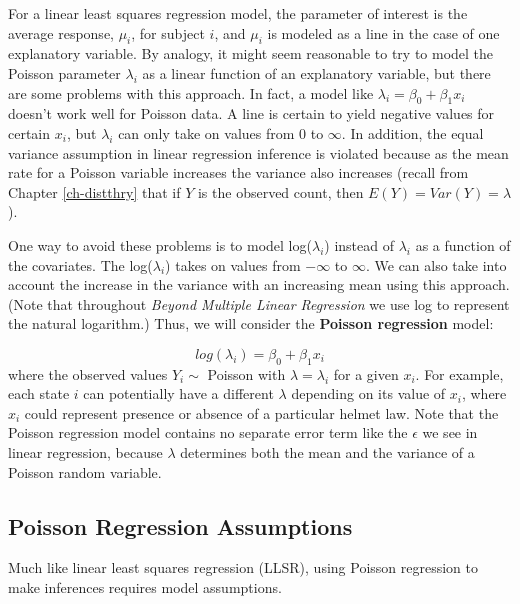 \documentclass[
]{krantz}
\begin{document}
For a linear least squares regression model, the parameter of interest is the average response, \(\mu_i\), for subject \(i\), and \(\mu_i\) is modeled as a line in the case of one explanatory variable. By analogy, it might seem reasonable to try to model the Poisson parameter \(\lambda_i\) as a linear function of an explanatory variable, but there are some problems with this approach. In fact, a model like \(\lambda_i=\beta_0+\beta_1x_i\) doesn't work well for Poisson data. A line is certain to yield negative values for certain \(x_i\), but \(\lambda_i\) can only take on values from 0 to \(\infty\). In addition, the equal variance assumption in linear regression inference is violated because as the mean rate for a Poisson variable increases the variance also increases (recall from Chapter \ref{ch-distthry} that if \(Y\) is the observed count, then \(E(Y)=Var(Y)=\lambda\)).

One way to avoid these problems is to model log(\(\lambda_i\)) instead of \(\lambda_i\) as a function of the covariates. The log(\(\lambda_i\)) takes on values from \(-\infty\) to \(\infty\). We can also take into account the increase in the variance with an increasing mean using this approach. (Note that throughout \emph{Beyond Multiple Linear Regression} we use log to represent the natural logarithm.) Thus, we will consider the \textbf{Poisson regression}  model:

\begin{equation*}
log(\lambda_i)=\beta_0+\beta_1 x_i
\end{equation*}
where the observed values \(Y_i \sim\) Poisson with \(\lambda=\lambda_i\) for a given \(x_i\). For example, each state \(i\) can potentially have a different \(\lambda\) depending on its value of \(x_i\), where \(x_i\) could represent presence or absence of a particular helmet law. Note that the Poisson regression model contains no separate error term like the \(\epsilon\) we see in linear regression, because \(\lambda\) determines both the mean and the variance of a Poisson random variable.

\hypertarget{poisson-regression-assumptions}{%
\subsection{Poisson Regression Assumptions}\label{poisson-regression-assumptions}}

Much like linear least squares regression (LLSR), using Poisson regression to make inferences requires model assumptions.
\end{document}

